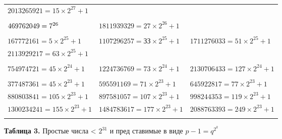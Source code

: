 \documentclass{mai_book}
\begin{document}
\begin{table}[h]
\centering
\small
\begin{tabular}{|l l l|}
\hline
$2013265921=15\times2^{27}+1$ & & \\ 
\multicolumn{3}{|c|}{} \\
\hline
$469762049=7\time 2^{26}$ & $1811939329=27\times2^{26}+1$ & \\  
\multicolumn{3}{|c|}{} \\
\hline
$167772161=5\times2^{25} + 1$ & $1107296257=ЗЗ\times2^{25}+1$ & $1711276033=51\times2^{25}+1$  \\
$2113929217=63\times2^{25}+1$ & & \\
\multicolumn{3}{|c|}{} \\ 
\hline
$754974721=45\times2^{24}+1$ & $1224736769 = 73\times2^{24}+1$ & $2130706433=127\times2^{24}+1$  \\
\multicolumn{3}{|c|}{} \\
\hline
$377487361=45\times2^{23}+1$ & $595591169=71\times2^{23}+1$ & $645922817=77\times2^{23}+1$ \\
$880803841=105\times2^{23}+1$ & $897581057=107\times2^{23}+1$ & $998244353=119\times2^{23}+1$ \\  
$1300234241=155 \times 2^{23}+1$ & $1484783617=177\times2^{23}+1$ & $2088763393=249\times2^{23}+1$ \\
\multicolumn{3}{|c|}{} \\  
\hline
\end{tabular}
\end{table}
\vspace{-14pt}
\begin{flushleft}
\textbf{Таблица 3.} Простые числа < $2^{31}$ и пред ставимые в виде $p - 1 = q^{2^{k}}$
\end{flushleft}
\pagebreak
\newpage

\end{document}
